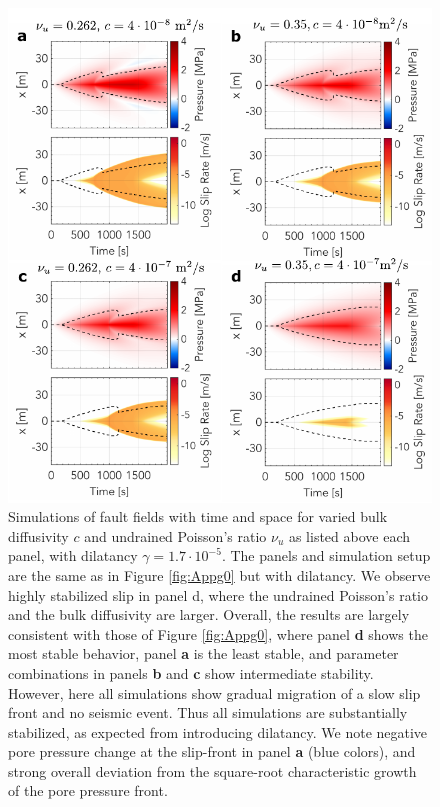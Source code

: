 \documentclass[draft]{agujournal2019}
\begin{document}
\begin{figure}[H]
\centering
\includegraphics[scale =  0.95]{Figures/gammasmall_comparison.pdf} %
\caption{
Simulations of fault fields with time and space for varied bulk diffusivity $c$ and undrained Poisson's ratio $\nu_u$ as listed above each panel, with dilatancy $\gamma = 1.7 \cdot 10^{-5}$. The panels and simulation setup are the same as in Figure \ref{fig:Appg0} but with dilatancy. We observe highly stabilized slip in panel d, where the undrained Poisson's ratio and the bulk diffusivity are larger. Overall, the results are largely consistent with those of Figure \ref{fig:Appg0}, where panel {\bf d} shows the most stable behavior, panel {\bf a} is the least stable, and parameter combinations in panels {\bf b} and {\bf c} show intermediate stability. However, here all simulations show gradual migration of a slow slip front and no seismic event. Thus all simulations are substantially stabilized, as expected from introducing dilatancy. We note negative pore pressure change at the slip-front in panel {\bf a} (blue colors), and strong overall deviation from the square-root characteristic growth of the pore pressure front. }
\label{fig:Appgs}
\end{figure}
\end{document}
